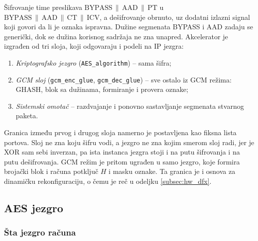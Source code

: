 Šifrovanje time preslikava \mbox{$\mathrm{BYPASS} \,\|\, \mathrm{AAD} \,\|\, \mathrm{PT}$} u \mbox{$\mathrm{BYPASS} \,\|\, \mathrm{AAD} \,\|\, \mathrm{CT} \,\|\, \mathrm{ICV}$}, a dešifrovanje obrnuto, uz dodatni izlazni signal koji govori da li je oznaka ispravna. Dužine segmenata BYPASS i AAD zadaju se generički, dok se dužina korisnog sadržaja ne zna unapred.
\smallbreak
Akcelerator je izgrađen od tri sloja, koji odgovaraju i podeli na IP jezgra:
\begin{enumerate}[itemsep=2pt]
    \item \textit{Kriptografsko jezgro} (\texttt{AES\_algorithm}) -- sama šifra;
    \item \textit{GCM sloj} (\texttt{gcm\_enc\_glue}, \texttt{gcm\_dec\_glue}) -- sve ostalo iz GCM režima: GHASH, blok sa dužinama, formiranje i provera oznake;
    \item \textit{Sistemski omotač} -- razdvajanje i ponovno sastavljanje segmenata stvarnog paketa.
\end{enumerate}
Granica između prvog i drugog sloja namerno je postavljena kao fiksna lista portova. Sloj ne zna koju šifru vodi, a jezgro ne zna kojim smerom sloj radi, jer je XOR sam sebi inverzan, pa ista instanca jezgra stoji i na putu šifrovanja i na putu dešifrovanja. GCM režim je pritom ugrađen u samo jezgro, koje formira brojački blok i računa potključ $H$ i masku oznake. Ta granica je i osnova za dinamičku rekonfiguraciju, o čemu je reč u odeljku \ref{subsec:hw_dfx}.

\subsection{AES jezgro}
\label{subsec:hw_aes_jezgro}

\subsubsection{Šta jezgro računa}

